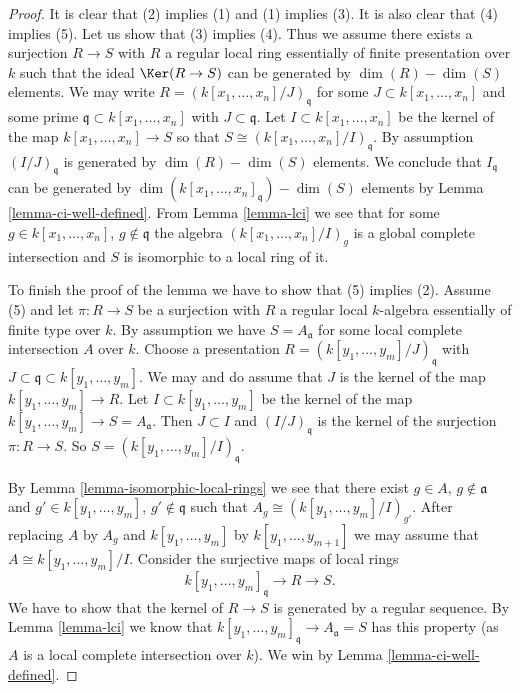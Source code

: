 \begin{proof}
It is clear that (2) implies (1) and (1) implies (3).
It is also clear that (4) implies (5). Let us show that (3) implies
(4). Thus we assume there exists a surjection
$R \to S$ with $R$ a regular local ring
essentially of finite presentation over $k$ such that the ideal
$\Ker(R \to S)$ can be generated by $\dim(R) - \dim(S)$ elements.
We may write $R = (k[x_1, \ldots, x_n]/J)_{\mathfrak q}$
for some $J \subset k[x_1, \ldots, x_n]$ and
some prime $\mathfrak q \subset k[x_1, \ldots, x_n]$ with
$J \subset \mathfrak q$. Let $I \subset k[x_1, \ldots, x_n]$
be the kernel of the map $k[x_1, \ldots, x_n] \to S$ so that
$S \cong (k[x_1, \ldots, x_n]/I)_{\mathfrak q}$.
By assumption $(I/J)_{\mathfrak q}$ is generated by
$\dim(R) - \dim(S)$ elements. We conclude that
$I_{\mathfrak q}$ can be generated by
$\dim(k[x_1, \ldots, x_n]_{\mathfrak q}) - \dim(S)$ elements
by Lemma \ref{lemma-ci-well-defined}.
From Lemma \ref{lemma-lci} we see that for some
$g \in k[x_1, \ldots, x_n]$, $g \not \in \mathfrak q$
the algebra $(k[x_1, \ldots, x_n]/I)_g$ is a global
complete intersection and $S$ is isomorphic to
a local ring of it.

\medskip\noindent
To finish the proof of the lemma we have to show that (5) implies (2).
Assume (5) and let $\pi : R \to S$ be a surjection with $R$ a regular local
$k$-algebra essentially of finite type over $k$.
By assumption we have $S = A_{\mathfrak a}$ for some local
complete intersection $A$ over $k$.
Choose a presentation $R = (k[y_1, \ldots, y_m]/J)_{\mathfrak q}$
with $J \subset \mathfrak q \subset k[y_1, \ldots, y_m]$.
We may and do assume that $J$ is the kernel of the map
$k[y_1, \ldots, y_m] \to R$. Let $I \subset k[y_1, \ldots, y_m]$
be the kernel of the map $k[y_1, \ldots, y_m] \to S = A_{\mathfrak a}$.
Then $J \subset I$ and $(I/J)_{\mathfrak q}$ is the kernel of
the surjection $\pi : R \to S$. So
$S = (k[y_1, \ldots, y_m]/I)_{\mathfrak q}$.

\medskip\noindent
By Lemma \ref{lemma-isomorphic-local-rings} we see that there exist
$g \in A$, $g \not \in \mathfrak a$ and
$g' \in k[y_1, \ldots, y_m]$, $g' \not \in \mathfrak q$
such that $A_g \cong (k[y_1, \ldots, y_m]/I)_{g'}$.
After replacing $A$ by $A_g$ and $k[y_1, \ldots, y_m]$ by
$k[y_1, \ldots, y_{m + 1}]$ we may assume that
$A \cong k[y_1, \ldots, y_m]/I$. Consider the surjective
maps of local rings
$$
k[y_1, \ldots, y_m]_{\mathfrak q} \to R \to S.
$$
We have to show that the kernel of $R \to S$ is generated by
a regular sequence. By Lemma \ref{lemma-lci} we know that
$k[y_1, \ldots, y_m]_{\mathfrak q} \to A_{\mathfrak a} = S$
has this property (as $A$ is a local complete intersection over $k$).
We win by Lemma \ref{lemma-ci-well-defined}.
\end{proof}

